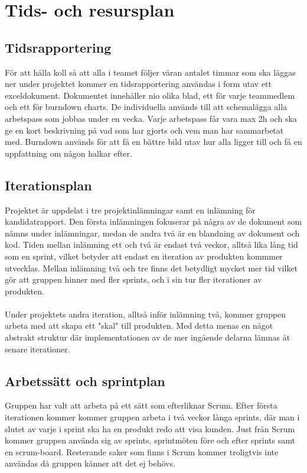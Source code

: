 \section{Tids- och resursplan}

\subsection{Tidsrapportering}
För att hålla koll så att alla i teamet följer våran antalet timmar som ska läggas ner under
projektet kommer en tidsrapportering\cite{bib-tidsrapportering} användas i form utav ett exceldokument. Dokumentet
innehåller nio olika blad, ett för varje teammedlem och ett för burndown charts.
De individuella används till att schemalägga alla arbetspass som jobbas under en vecka.
Varje arbetspass får vara max 2h och ska ge en kort beskrivning på vad som har gjorts och vem
man har sammarbetat med. Burndown används för att få en bättre bild utav hur alla ligger till
och få en uppfattning om någon halkar efter.


\subsection{Iterationsplan}
Projektet är uppdelat i tre projektinlämningar samt en inlämning för kandidatrapport. Den första inlämningen fokuserar på några av de dokument som nämns under inlämningar, medan de andra två är en blandning av dokument och kod. Tiden mellan inlämning ett och två är endast två veckor, alltså lika lång tid som en sprint, vilket betyder att endast en iteration av produkten kommmer utvecklas. Mellan inlämning två och tre finns det betydligt mycket mer tid vilket gör att gruppen hinner med fler sprints, och i sin tur fler iterationer av produkten.\\
\\
Under projektets andra iteration, alltså inför inlämning två, kommer gruppen arbeta med att skapa ett "skal" till produkten. Med detta menas en något abstrakt struktur där implementationen av de mer ingående delarna lämnas åt senare iterationer.

\subsection{Arbetssätt och sprintplan}
Gruppen har valt att arbeta på ett sätt som efterliknar Scrum. Efter första iterationen kommer kommer gruppen arbeta i två veckor långa sprints, där man i slutet av varje i sprint ska ha en produkt redo att visa kunden. Just från Scrum kommer gruppen använda sig av sprints, sprintmöten före och efter sprints samt en scrum-board. Resterande saker som finns i Scrum kommer troligtvis inte användas då gruppen känner att det ej behövs.

